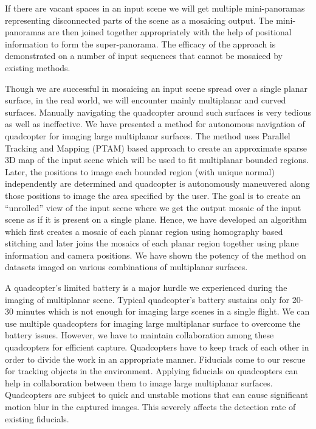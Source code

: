 If there are vacant spaces in an input scene we will get multiple mini-panoramas
representing disconnected parts of the scene as a mosaicing output.
The mini-panoramas are then joined together appropriately with the help of
positional information to form the super-panorama. The efficacy of the approach
is demonstrated on a number of input sequences that cannot be mosaiced by existing methods.

Though we are successful in mosaicing an input scene spread over a single planar
surface, in the real world, we will encounter mainly multiplanar and curved
surfaces. Manually navigating the quadcopter around such surfaces is very
tedious as well as ineffective. We have presented a method for autonomous
navigation of quadcopter for imaging large multiplanar surfaces. The method
uses Parallel Tracking and Mapping (PTAM) based approach to create an 
approximate sparse 3D map of the input scene which will be used to fit
multiplanar bounded regions. Later, the positions to image each bounded region
(with unique normal) independently are determined and quadcopter is
autonomously maneuvered along those positions to image the area specified by
the user. The goal is to create an ``unrolled'' view of the input scene where we
get the output mosaic of the input scene as if it is present on a single plane.
Hence, we have developed an algorithm which first creates a mosaic of each
planar region using homography based stitching and later joins the mosaics of
each planar region together using plane information and camera positions. We
have shown the potency of the method on datasets imaged on various combinations
of multiplanar surfaces.

A quadcopter's limited battery is a major hurdle we experienced during
the imaging of multiplanar scene. Typical quadcopter's battery sustains only for
20-30 minutes which is not enough for imaging large scenes in a single flight. We can use
multiple quadcopters for imaging large multiplanar surface to overcome the
battery issues. However, we have to maintain collaboration among these
quadcopters for efficient capture. Quadcopters have to keep track of each other
in order to divide the work in an appropriate manner. Fiducials come to our
rescue for tracking objects in the environment. Applying fiducials on quadcopters can
help in collaboration between them to image large multiplanar surfaces.
Quadcopters are subject to quick and unstable motions that can cause
significant motion blur in the captured images. This severely affects the
detection rate of existing fiducials. 

